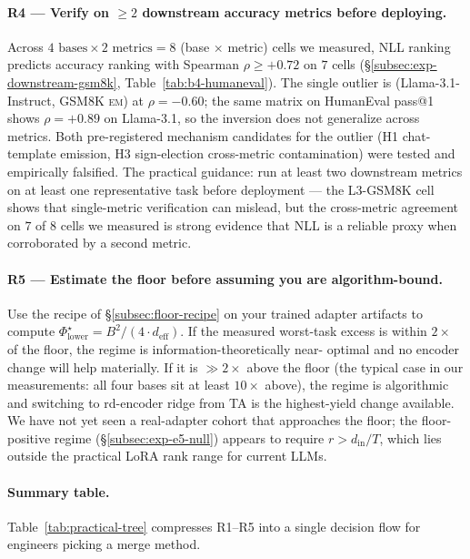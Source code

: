 \paragraph{R4 --- Verify on $\geq 2$ downstream accuracy
metrics before deploying.}
Across $4 \text{ bases} \times 2 \text{ metrics} = 8$
(base $\times$ metric) cells we measured, NLL ranking predicts
accuracy ranking with Spearman $\rho \geq +0.72$ on $7$ cells
(\S\ref{subsec:exp-downstream-gsm8k}, Table~\ref{tab:b4-humaneval}).
The single outlier is (Llama-3.1-Instruct, GSM8K \textsc{em})
at $\rho = -0.60$; the same matrix on HumanEval pass@1
shows $\rho = +0.89$ on Llama-3.1, so the inversion does not
generalize across metrics. Both pre-registered mechanism
candidates for the outlier (H1 chat-template emission, H3
sign-election cross-metric contamination) were tested and
empirically falsified. The practical guidance: run at least
two downstream metrics on at least one representative task
before deployment --- the L3-GSM8K cell shows that
single-metric verification can mislead, but the cross-metric
agreement on $7$ of $8$ cells we measured is strong evidence
that NLL is a reliable proxy when corroborated by a second
metric.

\paragraph{R5 --- Estimate the floor before assuming you are
algorithm-bound.}
Use the recipe of \S\ref{subsec:floor-recipe} on your trained adapter
artifacts to compute $\Phi^\star_{\mathrm{lower}} = B^2 / (4 \cdot
d_{\mathrm{eff}})$. If the measured worst-task excess is within
$2\times$ of the floor, the regime is information-theoretically near-
optimal and no encoder change will help materially. If it is $\gg
2\times$ above the floor (the typical case in our measurements: all
four bases sit at least $10\times$ above), the regime is algorithmic
and switching to rd-encoder ridge from TA is the highest-yield change
available. We have not yet seen a real-adapter cohort that approaches
the floor; the floor-positive regime
(\S\ref{subsec:exp-e5-null}) appears to require $r > d_{\mathrm{in}} /
T$, which lies outside the practical LoRA rank range for current
LLMs.

\paragraph{Summary table.}
Table~\ref{tab:practical-tree} compresses R1--R5 into a single
decision flow for engineers picking a merge method.

